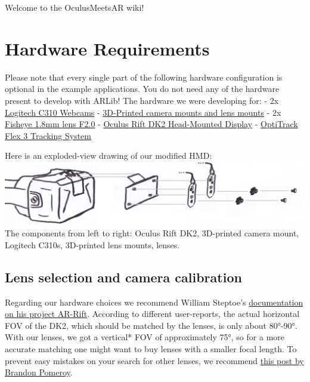 \documentclass[]{article}
\date{}
\begin{document}
Welcome to the OculusMeetsAR wiki!

\section{Hardware Requirements}\label{hardware-requirements}

Please note that every single part of the following hardware
configuration is optional in the example applications. You do not need
any of the hardware present to develop with ARLib! The hardware we were
developing for: - 2x
\href{http://www.logitech.com/de-de/product/hd-webcam-c310}{Logitech
C310 Webcams} -
\href{https://github.com/ands/OculusMeetsAR/tree/master/Hardware/Printmodels}{3D-Printed
camera mounts and lens mounts} - 2x
\href{http://www.camera2000.com/en/cctv-board-security-video-camera-1-8mm-lens-f2-0.html}{Fisheye
1.8mm lens F2.0} - \href{https://www.oculus.com/dk2/}{Oculus Rift DK2
Head-Mounted Display} -
\href{http://www.optitrack.com/products/flex-3/}{OptiTrack Flex 3
Tracking System}

Here is an exploded-view drawing of our modified HMD:\\
\includegraphics*{explosion.jpg}
The components from left to right: Oculus Rift DK2, 3D-printed camera
mount, Logitech C310s, 3D-printed lens mounts, lenses.

\subsection{Lens selection and camera
calibration}\label{lens-selection-and-camera-calibration}

Regarding our hardware choices we recommend William Steptoe's
\href{http://willsteptoe.com/post/67399683294/ar-rift-camera-selection-part-2}{documentation
on his project AR-Rift}. According to different user-reports, the actual
horizontal FOV of the DK2, which should be matched by the lenses, is
only about 80°-90°. With our lenses, we got a vertical* FOV of
approximately 75°, so for a more accurate matching one might want to buy
lenses with a smaller focal length. To prevent easy mistakes on your
search for other lenses, we recommend
\href{http://pomeroyprinting.blogspot.de/2014/04/modifying-logitech-c310-hd-webcam.html}{this
post by Brandon Pomeroy}.
\end{document}
